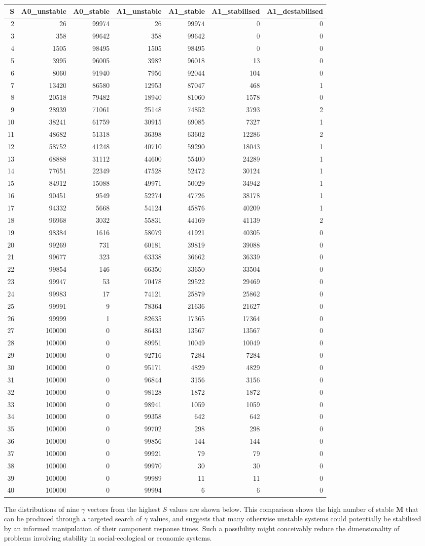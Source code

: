 \documentclass[]{article}
\begin{document}
\begin{longtable}[]{@{}rrrrrrr@{}}
\toprule
S & A0\_unstable & A0\_stable & A1\_unstable & A1\_stable &
A1\_stabilised & A1\_destabilised\tabularnewline
\midrule
\endhead
2 & 26 & 99974 & 26 & 99974 & 0 & 0\tabularnewline
3 & 358 & 99642 & 358 & 99642 & 0 & 0\tabularnewline
4 & 1505 & 98495 & 1505 & 98495 & 0 & 0\tabularnewline
5 & 3995 & 96005 & 3982 & 96018 & 13 & 0\tabularnewline
6 & 8060 & 91940 & 7956 & 92044 & 104 & 0\tabularnewline
7 & 13420 & 86580 & 12953 & 87047 & 468 & 1\tabularnewline
8 & 20518 & 79482 & 18940 & 81060 & 1578 & 0\tabularnewline
9 & 28939 & 71061 & 25148 & 74852 & 3793 & 2\tabularnewline
10 & 38241 & 61759 & 30915 & 69085 & 7327 & 1\tabularnewline
11 & 48682 & 51318 & 36398 & 63602 & 12286 & 2\tabularnewline
12 & 58752 & 41248 & 40710 & 59290 & 18043 & 1\tabularnewline
13 & 68888 & 31112 & 44600 & 55400 & 24289 & 1\tabularnewline
14 & 77651 & 22349 & 47528 & 52472 & 30124 & 1\tabularnewline
15 & 84912 & 15088 & 49971 & 50029 & 34942 & 1\tabularnewline
16 & 90451 & 9549 & 52274 & 47726 & 38178 & 1\tabularnewline
17 & 94332 & 5668 & 54124 & 45876 & 40209 & 1\tabularnewline
18 & 96968 & 3032 & 55831 & 44169 & 41139 & 2\tabularnewline
19 & 98384 & 1616 & 58079 & 41921 & 40305 & 0\tabularnewline
20 & 99269 & 731 & 60181 & 39819 & 39088 & 0\tabularnewline
21 & 99677 & 323 & 63338 & 36662 & 36339 & 0\tabularnewline
22 & 99854 & 146 & 66350 & 33650 & 33504 & 0\tabularnewline
23 & 99947 & 53 & 70478 & 29522 & 29469 & 0\tabularnewline
24 & 99983 & 17 & 74121 & 25879 & 25862 & 0\tabularnewline
25 & 99991 & 9 & 78364 & 21636 & 21627 & 0\tabularnewline
26 & 99999 & 1 & 82635 & 17365 & 17364 & 0\tabularnewline
27 & 100000 & 0 & 86433 & 13567 & 13567 & 0\tabularnewline
28 & 100000 & 0 & 89951 & 10049 & 10049 & 0\tabularnewline
29 & 100000 & 0 & 92716 & 7284 & 7284 & 0\tabularnewline
30 & 100000 & 0 & 95171 & 4829 & 4829 & 0\tabularnewline
31 & 100000 & 0 & 96844 & 3156 & 3156 & 0\tabularnewline
32 & 100000 & 0 & 98128 & 1872 & 1872 & 0\tabularnewline
33 & 100000 & 0 & 98941 & 1059 & 1059 & 0\tabularnewline
34 & 100000 & 0 & 99358 & 642 & 642 & 0\tabularnewline
35 & 100000 & 0 & 99702 & 298 & 298 & 0\tabularnewline
36 & 100000 & 0 & 99856 & 144 & 144 & 0\tabularnewline
37 & 100000 & 0 & 99921 & 79 & 79 & 0\tabularnewline
38 & 100000 & 0 & 99970 & 30 & 30 & 0\tabularnewline
39 & 100000 & 0 & 99989 & 11 & 11 & 0\tabularnewline
40 & 100000 & 0 & 99994 & 6 & 6 & 0\tabularnewline
\bottomrule
\end{longtable}

The distributions of nine \(\gamma\) vectors from the highest \(S\)
values are shown below. This comparison shows the high number of stable
\(\mathbf{M}\) that can be produced through a targeted search of
\(\gamma\) values, and suggests that many otherwise unstable systems
could potentially be stabilised by an informed manipulation of their
component response times. Such a possibility might conceivably reduce
the dimensionality of problems involving stability in social-ecological
or economic systems.
\end{document}
